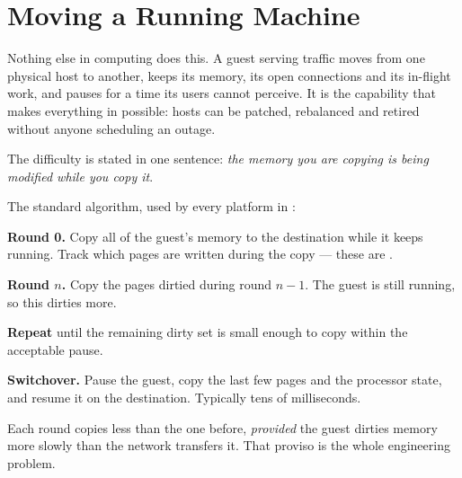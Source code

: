 \section{Moving a Running Machine}

Nothing else in computing does this. A guest serving traffic moves from one
physical host to another, keeps its memory, its open connections and its
in-flight work, and pauses for a time its users cannot perceive. It is the
capability that makes everything in  possible: hosts can be
patched, rebalanced and retired without anyone scheduling an outage.

The difficulty is stated in one sentence: \emph{the memory you are copying is
being modified while you copy it}.

\begin{definitionbox}
The standard algorithm, used by every platform in :

\begin{tight}
  \item \textbf{Round 0.} Copy all of the guest's memory to the destination
        while it keeps running. Track which pages are written during the copy
        --- these are .
  \item \textbf{Round $n$.} Copy the pages dirtied during round $n-1$. The
        guest is still running, so this dirties more.
  \item \textbf{Repeat} until the remaining dirty set is small enough to copy
        within the acceptable pause.
  \item \textbf{Switchover.} Pause the guest, copy the last few pages and the
        processor state, and resume it on the destination. Typically tens of
        milliseconds.
\end{tight}

\smallskip
Each round copies less than the one before, \emph{provided} the guest dirties
memory more slowly than the network transfers it. That proviso is the whole
engineering problem.
\end{definitionbox}

